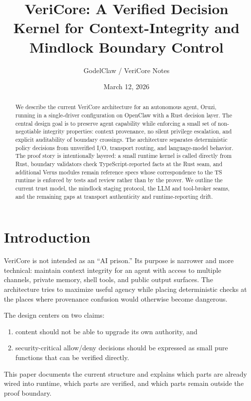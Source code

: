 \documentclass[11pt]{article}
\title{VeriCore: A Verified Decision Kernel for Context-Integrity and Mindlock Boundary Control}
\author{GodelClaw / VeriCore Notes}
\date{March 12, 2026}
\begin{document}
\maketitle

\begin{abstract}
We describe the current VeriCore architecture for an autonomous agent, Oruzi, running in a single-driver configuration on OpenClaw with a Rust decision layer. The central design goal is to preserve agent capability while enforcing a small set of non-negotiable integrity properties: context provenance, no silent privilege escalation, and explicit auditability of boundary crossings. The architecture separates deterministic policy decisions from unverified I/O, transport routing, and language-model behavior. The proof story is intentionally layered: a small runtime kernel is called directly from Rust, boundary validators check TypeScript-reported facts at the Rust seam, and additional Verus modules remain reference specs whose correspondence to the TS runtime is enforced by tests and review rather than by the prover. We outline the current trust model, the mindlock staging protocol, the LLM and tool-broker seams, and the remaining gaps at transport authenticity and runtime-reporting drift.
\end{abstract}

\section{Introduction}
VeriCore is not intended as an ``AI prison.'' Its purpose is narrower and more technical: maintain context integrity for an agent with access to multiple channels, private memory, shell tools, and public output surfaces. The architecture tries to maximize useful agency while placing deterministic checks at the places where provenance confusion would otherwise become dangerous.

The design centers on two claims:
\begin{enumerate}[label=\arabic*.]
\item content should not be able to upgrade its own authority, and
\item security-critical allow/deny decisions should be expressed as small pure functions that can be verified directly.
\end{enumerate}

This paper documents the current structure and explains which parts are already wired into runtime, which parts are verified, and which parts remain outside the proof boundary.
\end{document}
